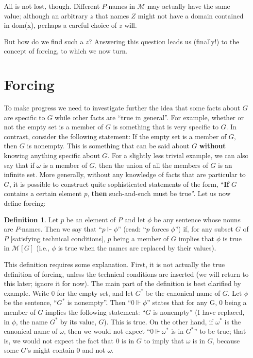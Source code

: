 \documentclass[10pt]{article}
\theoremstyle{definition}
\newtheorem*{defn}{Definition}
\theoremstyle{remark}
\begin{document}
All is not lost, though. Different $P$-names in $\mathcal M$ may actually have the same value; although an arbitrary $z$ that names $Z$ might not have a domain contained in dom(x), perhaps a careful choice of $z$ will.

But how do we find such a $z$? Answering this question leads us (finally!) to the concept of forcing, to which we now turn.


\section{Forcing}

To make progress we need to investigate further the idea that some facts about $G$ are specific to $G$ while other facts are ``true in general''. For example, whether or not the empty set is a member of $G$ is something that is very specific to $G$. In contrast, consider the following statement: If the empty set is a member of $G$, then $G$ is nonempty. This is something that can be said about $G$ \textbf{without} knowing anything specific about $G$. For a slightly less trivial example, we can also say that if $\omega$ is a member of $G$, then the union of all the members of $G$ is an infinite set. More generally, without any knowledge of facts that are particular to $G$, it is possible to construct quite sophisticated statements of the form, ``\textbf{If} $G$ contains a certain element $p$, \textbf{then} such-and-such must be true''. Let us now define forcing:

\begin{defn}
Let $p$ be an element of $P$ and let $\phi$ be any sentence whose nouns are $P$-names. Then we say that ``$p \Vdash \phi$'' (read: ``$p$ forces $\phi$'') if, for any subset $G$ of $P$ [satisfying technical conditions], $p$ being a member of $G$ implies that $\phi$ is true in $\mathcal M[G]$ (i.e., $\phi$ is true when the names are replaced by their values).
\end{defn}

This definition requires some explanation. First, it is not actually the true definition of forcing, unless the technical conditions are inserted (we will return to this later; ignore it for now). The main part of the definition is best clarified by example. Write $0$ for the empty set, and let $G^*$ be the canonical name of $G$. Let $\phi$ be the sentence, ``$G^*$ is nonempty''. Then ``$0 \Vdash \phi$'' states that for any G, 0 being a member of $G$ implies the following statement: ``$G$ is nonempty'' (I have replaced, in $\phi$, the name $G^*$ by its value, $G$). This is true. On the other hand, if $\omega^*$ is the canonical name of $\omega$, then we would not expect ``$0 \Vdash \omega^*$ is in $G^*$'' to be true; that is, we would not expect the fact that $0$ is in $G$ to imply that $\omega$ is in $G$, because some $G$'s might contain $0$ and not $\omega$.
\end{document}
